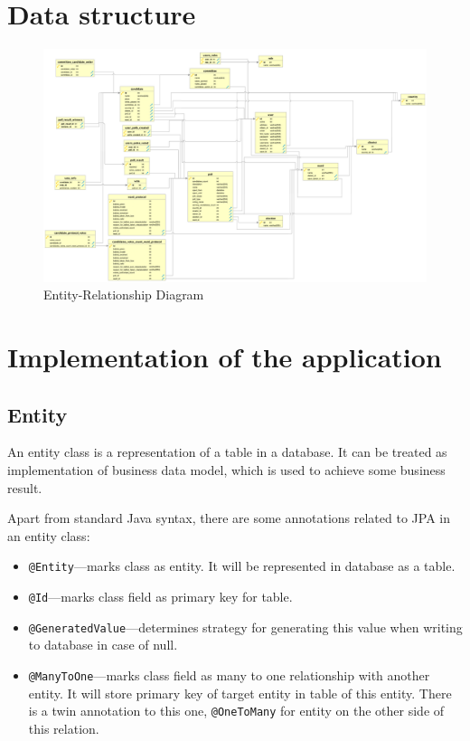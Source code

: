 \documentclass[a4paper,twoside,12pt]{book}
\begin{document}
  \section{Data structure}
    \begin{figure}[h]
      \includegraphics[width=\linewidth]{erd.png}
      \caption{Entity-Relationship Diagram}
      \label{fig:erd}
    \end{figure}

  \section{Implementation of the application}
    \subsection{Entity}
      An entity class is a representation of a table in a database.
      It can be treated as implementation of business data model, which is used to achieve some business result.

      Apart from standard Java syntax, there are some annotations related to JPA in an entity class:
      \begin{itemize}
        \item\lstinline|@Entity|---marks class as entity. It will be represented in database as a table.
        \item\lstinline|@Id|---marks class field as primary key for table.
        \item\lstinline|@GeneratedValue|---determines strategy for generating this value when writing to database in case of null.
        \item\lstinline|@ManyToOne|---marks class field as many to one relationship with another entity. 
        It will store primary key of target entity in table of this entity.
        There is a twin annotation to this one, \lstinline|@OneToMany| for entity on the other side of this relation.
      \end{itemize}
    
\end{document}
